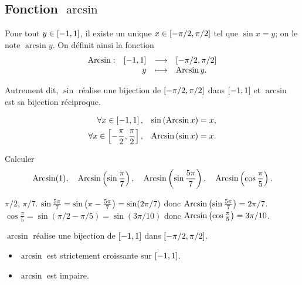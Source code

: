 \documentclass{magnolia}
\begin{document}
\subsection{Fonction $\arcsin$}

\begin{definition}[utile=-3]
Pour tout $y\in\left[-1,1\right]$, il existe un unique $x\in\left[-\pi/2,\pi/2\right]$
tel que $\sin x=y$; on le note $\arcsin y$. On définit ainsi la fonction
\[\begin{array}[t]{lrcl} \displaystyle{\operatorname{Arcsin}} : & \displaystyle{[-1,1]} & \longrightarrow & \displaystyle{\left[-\pi/2,\pi/2\right]} \\ & \displaystyle{y} & \longmapsto & \displaystyle{\operatorname{Arcsin}y .} \end{array}\]
\end{definition}

\begin{remarqueUnique}
\remarque Autrement dit, $\sin$ réalise une bijection de $\left[-\pi/2,\pi/2\right]$ dans $\left[-1,1\right]$ et $\arcsin$ est sa bijection réciproque.
\end{remarqueUnique}

\begin{proposition}[utile=-3]
\begin{eqnarray*}
\forall x\in\left[-1,1\right], & & \sin\left(\operatorname{Arcsin} x\right)=x,\\
\forall x\in\left[-\frac{\pi}{2},\frac{\pi}{2}\right], & &
  \operatorname{Arcsin}\left(\sin x\right)=x .    
\end{eqnarray*}
\end{proposition}

\begin{exoUnique}
\exemple Calculer
  \[\operatorname{Arcsin}(1), \quad \operatorname{Arcsin}\left(\sin\frac{\pi}{7}\right), \quad
    \operatorname{Arcsin}\left(\sin\frac{5\pi}{7}\right), \quad \operatorname{Arcsin}\left(\cos\frac{\pi}{5}\right).\]
\end{exoUnique}

\begin{sol}
$\pi/2$, $\pi/7$.
$\sin\frac{5\pi}{7}=\sin\left(\pi-\frac{5\pi}{7}\right)=\sin(2\pi/7)$ donc $\operatorname{Arcsin}\left(\sin\frac{5\pi}{7}\right)=2\pi/7$.
$\cos\frac{\pi}{5}=\sin(\pi/2-\pi/5)=\sin(3\pi/10)$ donc $\operatorname{Arcsin}\left(\cos\frac{\pi}{5}\right)=3\pi/10$.


\end{sol}

\begin{proposition}[utile=-3]
$\arcsin$ réalise une bijection de $\left[-1,1\right]$ dans $\left[-\pi/2,\pi/2\right]$.
\end{proposition}

\begin{proposition}[utile=-3]
\begin{itemize}
\item $\arcsin$ est strictement croissante sur $\left[-1,1\right]$.
\item $\arcsin$ est impaire.
\end{itemize}
\end{proposition}
\end{document}
